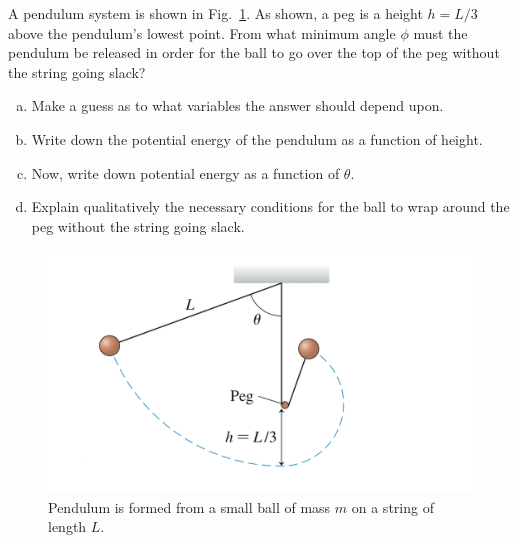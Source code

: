 \documentclass[10pt]{article}
\begin{document}
A pendulum system is shown in Fig.~\ref{pendulum}. As shown, a peg is a height $h= L/3$ above the pendulum's lowest point. From what minimum angle $\phi$ must the pendulum be released in order for the ball to go over the top of the peg without the string going slack?
\begin{enumerate}[(a)]
\item{Make a guess as to what variables the answer should depend upon.}
\vspace{-2mm}
\item{Write down the potential energy of the pendulum as a function of height.}
\vspace{-2mm}
\item{Now, write down potential energy as a function of $\theta$.}
\vspace{-2mm}
\item{Explain qualitatively the necessary conditions for the ball to wrap around the peg without the string going slack.}


\end{enumerate}
\begin{figure}[h!]
\centering
\includegraphics[width=.5\linewidth]{PS6_FigA.png}
\caption{Pendulum is formed from a small ball of mass $m$ on a string of length $L$.}
\label{pendulum}
\end{figure}
\end{document}
